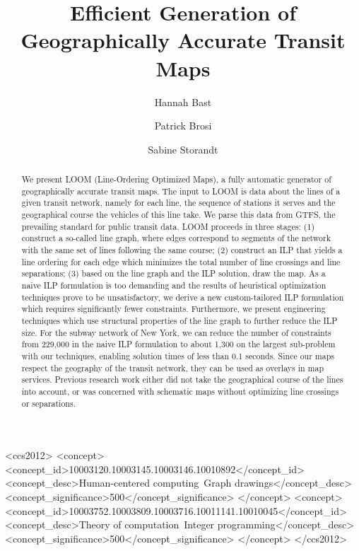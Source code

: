 \documentclass[format=acmsmall, review=false, screen=true]{acmart}
\begin{document}
\title{Efficient Generation of Geographically Accurate Transit Maps}

\author{Hannah Bast}

\author{Patrick Brosi}

\author{Sabine Storandt}

\begin{abstract}
We present LOOM (Line-Ordering Optimized Maps), a fully automatic generator of geographically accurate transit maps.
The input to LOOM is data about the lines of a given transit network, namely for each line, the sequence of stations it serves and the geographical course the vehicles of this line take. We parse this data from GTFS, the prevailing standard for public transit data.
LOOM proceeds in three stages:
	(1) construct a so-called line graph, where edges correspond to segments of the network with the same set of lines following the same course;
	(2) construct an ILP that yields a line ordering for each edge which minimizes the total number of line crossings and line separations;
	(3) based on the line graph and the ILP solution, draw the map.
As a naive ILP formulation is too demanding and the results of heuristical optimization techniques prove to be unsatisfactory, we derive a new custom-tailored ILP formulation which requires significantly fewer constraints. Furthermore, we present engineering techniques which use structural properties of the line graph to further reduce the ILP size. For the subway network of New York, we can reduce the number of constraints from 229,000 in the naive ILP formulation to about 1,300 on the largest sub-problem with our techniques, enabling solution times of less than 0.1 seconds. Since our maps respect the geography of the transit network, they can be used as overlays in map services. Previous research work either did not take the geographical course of the lines into account, or was concerned with schematic maps without optimizing line crossings or separations.
\end{abstract}

\def\UrlFont{\normalsize}

%
%
\begin{CCSXML}
<ccs2012>
<concept>
<concept_id>10003120.10003145.10003146.10010892</concept_id>
<concept_desc>Human-centered computing~Graph drawings</concept_desc>
<concept_significance>500</concept_significance>
</concept>
<concept>
<concept_id>10003752.10003809.10003716.10011141.10010045</concept_id>
<concept_desc>Theory of computation~Integer programming</concept_desc>
<concept_significance>500</concept_significance>
</concept>
</ccs2012>
\end{CCSXML}
\end{document}
